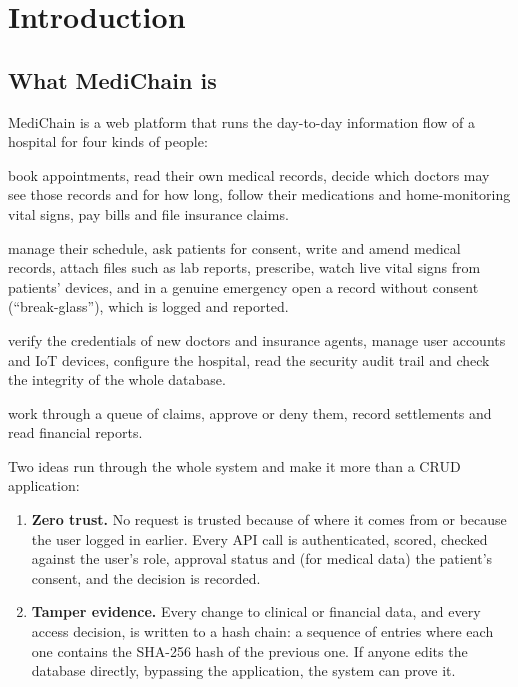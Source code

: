 \chapter{Introduction}\label{ch:intro}

\section{What MediChain is}

MediChain is a web platform that runs the day-to-day information flow of a
hospital for four kinds of people:

\begin{description}[leftmargin=2.4cm,style=nextline]
  \item[Patients] book appointments, read their own medical records, decide which
    doctors may see those records and for how long, follow their medications and
    home-monitoring vital signs, pay bills and file insurance claims.
  \item[Doctors] manage their schedule, ask patients for consent, write and amend
    medical records, attach files such as lab reports, prescribe, watch live vital
    signs from patients' devices, and in a genuine emergency open a record without
    consent (``break-glass''), which is logged and reported.
  \item[Administrators] verify the credentials of new doctors and insurance agents,
    manage user accounts and IoT devices, configure the hospital, read the security
    audit trail and check the integrity of the whole database.
  \item[Insurance agents] work through a queue of claims, approve or deny them,
    record settlements and read financial reports.
\end{description}

Two ideas run through the whole system and make it more than a CRUD application:

\begin{enumerate}
  \item \textbf{Zero trust.} No request is trusted because of where it comes from
    or because the user logged in earlier. Every API call is authenticated, scored,
    checked against the user's role, approval status and (for medical data) the
    patient's consent, and the decision is recorded.
  \item \textbf{Tamper evidence.} Every change to clinical or financial data, and
    every access decision, is written to a hash chain: a sequence of entries where
    each one contains the SHA-256 hash of the previous one. If anyone edits the
    database directly, bypassing the application, the system can prove it.
\end{enumerate}

